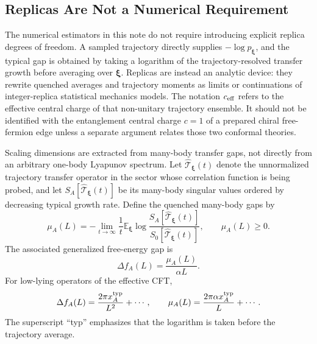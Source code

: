 \documentclass[aps,prb,onecolumn,nofootinbib,superscriptaddress]{revtex4-2}
\newcommand{\E}{\mathbb{E}}
\newcommand{\bxi}{{\boldsymbol{\xi}}}
\theoremstyle{plain}
\theoremstyle{definition}
\begin{document}
\subsection{Replicas Are Not a Numerical Requirement}
\label{sec:replica-clarification}

The numerical estimators in this note do not require introducing explicit
replica degrees of freedom.  A sampled trajectory directly supplies
\(-\log p_\bxi\), and the typical gap is obtained by taking a logarithm of the
trajectory-resolved transfer growth before averaging over \(\bxi\).  Replicas
are instead an analytic device: they rewrite quenched averages and trajectory
moments as limits or continuations of integer-replica statistical mechanics
models.  The notation \(c_{\rm eff}\) refers to the effective central charge
of that non-unitary trajectory ensemble.  It should not be identified with the
entanglement central charge \(c=1\) of a prepared chiral free-fermion edge
unless a separate argument relates those two conformal theories.

Scaling dimensions are extracted from many-body transfer gaps, not directly
from an arbitrary one-body Lyapunov spectrum.  Let
\(\widehat{\mathcal T}_\bxi(t)\) denote the unnormalized trajectory transfer
operator in the sector whose correlation function is being probed, and let
\(S_A[\widehat{\mathcal T}_\bxi(t)]\) be its many-body singular values ordered
by decreasing typical growth rate.  Define the quenched many-body gaps by
\begin{equation}
  \mu_A(L)
  =
  -\lim_{t\to\infty}
  \frac{1}{t}
  \E_\bxi
  \log
  \frac{
    S_A[\widehat{\mathcal T}_\bxi(t)]
  }{
    S_0[\widehat{\mathcal T}_\bxi(t)]
  },
  \qquad
  \mu_A(L)\ge 0 .
  \label{eq:many-body-transfer-gap}
\end{equation}
The associated generalized free-energy gap is
\begin{equation}
  \Delta f_A(L)
  =
  \frac{\mu_A(L)}{\alpha L}.
  \label{eq:many-body-free-energy-gap}
\end{equation}
For low-lying operators of the effective CFT,
\begin{equation}
  \Delta f_A(L)
  =
  \frac{2\pi x_A^{\rm typ}}{L^2}+\cdots ,
  \qquad
  \mu_A(L)
  =
  \frac{2\pi\alpha x_A^{\rm typ}}{L}+\cdots .
  \label{eq:scaling-dimensions-from-gaps}
\end{equation}
The superscript ``typ'' emphasizes that the logarithm is taken before the
trajectory average.
\end{document}
